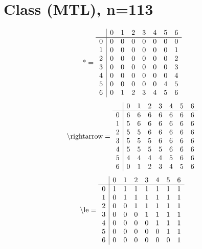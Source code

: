 \documentclass[11pt]{article}
\begin{document}
\section{Class (MTL), n=113}
\[\text{*} = 
\begin{array}{r | r r r r r r r}
 & 0 & 1 & 2 & 3 & 4 & 5 & 6 \\ \hline
0 & 0 & 0 & 0 & 0 & 0 & 0 & 0 \\
1 & 0 & 0 & 0 & 0 & 0 & 0 & 1 \\
2 & 0 & 0 & 0 & 0 & 0 & 0 & 2 \\
3 & 0 & 0 & 0 & 0 & 0 & 0 & 3 \\
4 & 0 & 0 & 0 & 0 & 0 & 0 & 4 \\
5 & 0 & 0 & 0 & 0 & 0 & 4 & 5 \\
6 & 0 & 1 & 2 & 3 & 4 & 5 & 6 \\
\end{array}
\]
\[\text{\textbackslash rightarrow} = 
\begin{array}{r | r r r r r r r}
 & 0 & 1 & 2 & 3 & 4 & 5 & 6 \\ \hline
0 & 6 & 6 & 6 & 6 & 6 & 6 & 6 \\
1 & 5 & 6 & 6 & 6 & 6 & 6 & 6 \\
2 & 5 & 5 & 6 & 6 & 6 & 6 & 6 \\
3 & 5 & 5 & 5 & 6 & 6 & 6 & 6 \\
4 & 5 & 5 & 5 & 5 & 6 & 6 & 6 \\
5 & 4 & 4 & 4 & 4 & 5 & 6 & 6 \\
6 & 0 & 1 & 2 & 3 & 4 & 5 & 6 \\
\end{array}
\]
\[\text{\textbackslash le} = 
\begin{array}{r | r r r r r r r}
 & 0 & 1 & 2 & 3 & 4 & 5 & 6 \\ \hline
0 & 1 & 1 & 1 & 1 & 1 & 1 & 1 \\
1 & 0 & 1 & 1 & 1 & 1 & 1 & 1 \\
2 & 0 & 0 & 1 & 1 & 1 & 1 & 1 \\
3 & 0 & 0 & 0 & 1 & 1 & 1 & 1 \\
4 & 0 & 0 & 0 & 0 & 1 & 1 & 1 \\
5 & 0 & 0 & 0 & 0 & 0 & 1 & 1 \\
6 & 0 & 0 & 0 & 0 & 0 & 0 & 1 \\
\end{array}
\]
\end{document}
